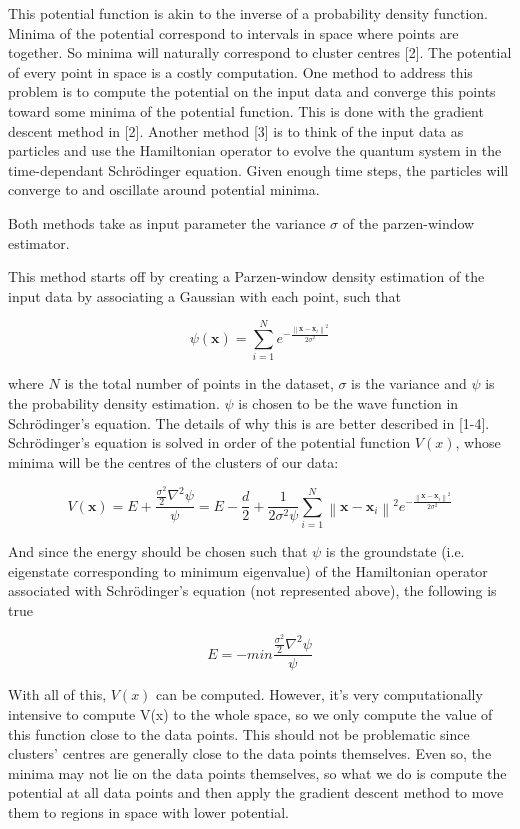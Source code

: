 This potential function is akin to the inverse of a probability density function. Minima of the potential correspond to intervals in space where points are together. So minima will naturally correspond to cluster centres [2]. The potential of every point in space is a costly computation. One method to address this problem is to compute the potential on the input data and converge this points toward some minima of the potential function. This is done with the gradient descent method in [2]. Another method [3] is to think of the input data as particles and use the Hamiltonian operator to evolve the quantum system in the time-dependant Schrödinger equation. Given enough time steps, the particles will converge to and oscillate around potential minima.

Both methods take as input parameter the variance $\sigma$ of the parzen-window estimator.

This method starts off by creating a Parzen-window density estimation of the input data by associating a Gaussian with each point, such that

$$ \psi (\mathbf{x}) = \sum ^N _{i=1} e^{- \frac{\left \| \mathbf{x}-\mathbf{x}_i \right \| ^2}{2 \sigma ^2}} $$

where $N$ is the total number of points in the dataset, $\sigma$ is the variance and $\psi$ is the probability density estimation. $\psi$ is chosen to be the wave function in Schrödinger's equation. The details of why this is are better described in [1-4]. Schrödinger's equation is solved in order of the potential function $V(x)$, whose minima will be the centres of the clusters of our data:      

$$
V(\mathbf{x}) = E + \frac {\frac{\sigma^2}{2}\nabla^2 \psi }{\psi} 
= E - \frac{d}{2} + \frac {1}{2 \sigma^2 \psi} \sum ^N _{i=1} \left \| \mathbf{x}-\mathbf{x}_i \right \| ^2 e^{- \frac{\left \| \mathbf{x}-\mathbf{x}_i \right \| ^2}{2 \sigma ^2}}
$$

And since the energy should be chosen such that $\psi$ is the groundstate (i.e. eigenstate corresponding to minimum eigenvalue) of the Hamiltonian operator associated with Schrödinger's equation (not represented above), the following is true

$$
E = - min \frac {\frac{\sigma^2}{2}\nabla^2 \psi }{\psi}
$$

With all of this, $V(x)$ can be computed. However, it's very computationally intensive to compute V(x) to the whole space, so we only compute the value of this function close to the data points. This should not be problematic since clusters' centres are generally close to the data points themselves. Even so, the minima may not lie on the data points themselves, so what we do is compute the potential at all data points and then apply the gradient descent method to move them to regions in space with lower potential.


